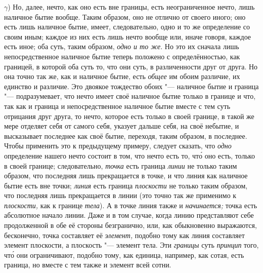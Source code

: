 $\gamma$) Но, далее, нечто, как оно есть вне границы, есть
неограниченное нечто, лишь наличное бытие вообще. Таким образом, оно не
отлично от своего иного; оно есть лишь наличное бытие, имеет,
следовательно, одно и то же определение со своим иным; каждое из них есть
лишь нечто вообще или, иначе говоря, каждое есть иное; оба суть, таким
образом, {\em одно и то же}. Но это их сначала лишь
непосредственное наличное бытие теперь положено с определённостью, как
границей, в которой оба суть то, что они суть, в различенности друг от
друга. Но она точно так же, как и наличное бытие, есть
{\em общее} им обоим различие, их единство и различие.
Это двоякое тождество обоих "--- наличное бытие и граница "--- подразумевает, что
нечто имеет своё наличное бытие только в границе и что, так как и граница и
непосредственное наличное бытие вместе с тем суть отрицания друг друга, то
нечто, которое есть только в своей границе, в такой же мере отделяет себя
от самого себя, указует дальше себя, на своё небытие, и высказывает
последнее как своё бытие, переходя, таким образом, в последнее. Чтобы
применить это к предыдущему примеру, следует сказать, что
{\em одно} определение нашего нечто состоит в том, что
нечто есть то, чт\'{о} оно есть, только в своей границе; следовательно,
{\em точка} есть граница
{\em линии} не только таким образом, что последняя лишь
прекращается в точке, и что линия как наличное бытие есть вне точки;
{\em линия} есть граница
{\em плоскости} не только таким образом, что последняя
лишь прекращается в линии (это точно так же применимо к
{\em плоскости,} как к границе
{\em тела}). А в точке линия также и
{\em начинается;} точка есть абсолютное начало линии.
Даже и в том случае, когда линию представляют себе продолженной в обе её
стороны безгранично, или, как обыкновенно выражаются, бесконечно, точка
составляет её {\em элемент,} подобно тому как линия
составляет элемент плоскости, а плоскость "--- элемент тела. Эти
{\em границы} суть {\em принцип}
того, чт\'{о} они ограничивают, подобно тому, как единица, например, как сотая,
есть граница, но вместе с тем также и элемент всей сотни.

